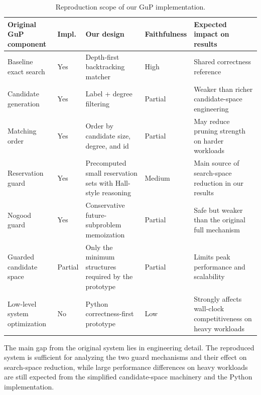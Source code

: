 \begin{table}[t]
  \caption{Reproduction scope of our GuP implementation.}
  \label{tab:repro-scope}
  \centering
  \scriptsize
  \setlength{\tabcolsep}{3pt}
  \renewcommand{\arraystretch}{1.03}
  \begin{tabular}{p{}p{}p{}p{}p{}}
    \toprule
    Original GuP component & Impl. & Our design & Faithfulness & Expected impact on results \\
    \midrule
    Baseline exact search & Yes & Depth-first backtracking matcher & High & Shared correctness reference \\
    Candidate generation & Yes & Label + degree filtering & Partial & Weaker than richer candidate-space engineering \\
    Matching order & Yes & Order by candidate size, degree, and id & Partial & May reduce pruning strength on harder workloads \\
    Reservation guard & Yes & Precomputed small reservation sets with Hall-style reasoning & Medium & Main source of search-space reduction in our results \\
    Nogood guard & Yes & Conservative future-subproblem memoization & Partial & Safe but weaker than the original full mechanism \\
    Guarded candidate space & Partial & Only the minimum structures required by the prototype & Partial & Limits peak performance and scalability \\
    Low-level system optimization & No & Python correctness-first prototype & Low & Strongly affects wall-clock competitiveness on heavy workloads \\
    \bottomrule
  \end{tabular}
\end{table}

The main gap from the original system lies in engineering detail. The reproduced system is sufficient for analyzing the two guard mechanisms and their effect on search-space reduction, while large performance differences on heavy workloads are still expected from the simplified candidate-space machinery and the Python implementation.
